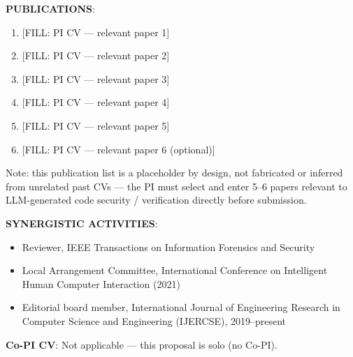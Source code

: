 \documentclass[11pt]{article}
\begin{document}
\medskip
\textbf{PUBLICATIONS}:
\begin{enumerate}[nosep]
\item {[FILL: PI CV --- relevant paper 1]}
\item {[FILL: PI CV --- relevant paper 2]}
\item {[FILL: PI CV --- relevant paper 3]}
\item {[FILL: PI CV --- relevant paper 4]}
\item {[FILL: PI CV --- relevant paper 5]}
\item {[FILL: PI CV --- relevant paper 6 (optional)]}
\end{enumerate}
{\small Note: this publication list is a placeholder by design, not fabricated or inferred from unrelated past CVs --- the PI must select and enter 5--6 papers relevant to LLM-generated code security / verification directly before submission.}

\medskip
\textbf{SYNERGISTIC ACTIVITIES}:
\begin{itemize}[nosep]
\item Reviewer, IEEE Transactions on Information Forensics and Security
\item Local Arrangement Committee, International Conference on Intelligent Human Computer Interaction (2021)
\item Editorial board member, International Journal of Engineering Research in Computer Science and Engineering (IJERCSE), 2019--present
\end{itemize}

\bigskip
\textbf{Co-PI CV}: Not applicable --- this proposal is solo (no Co-PI).
\end{document}
